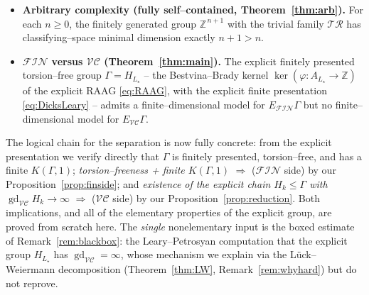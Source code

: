 \documentclass{amsart}
\theoremstyle{definition}
\newcommand{\Z}{\mathbb{Z}}
\newcommand{\FIN}{\mathcal{F\!I\!N}}
\newcommand{\VC}{\mathcal{V\!C}}
\newcommand{\gd}{\operatorname{gd}}
\begin{document}
\begin{itemize}
\item \textbf{Arbitrary complexity (fully self--contained, Theorem~\ref{thm:arb}).} For each
$n\ge 0$, the finitely generated group $\Z^{\,n+1}$ with the trivial family $\mathcal{TR}$ has
classifying--space minimal dimension exactly $n+1>n$.

\item \textbf{$\FIN$ versus $\VC$ (Theorem~\ref{thm:main}).} The explicit finitely presented
torsion--free group $\Gamma=H_{L_\star}$ -- the Bestvina--Brady kernel
$\ker(\varphi:A_{L_\star}\to\Z)$ of the explicit RAAG \eqref{eq:RAAG}, with the explicit finite
presentation \eqref{eq:DicksLeary} -- admits a finite--dimensional model for $E_{\FIN}\Gamma$
but no finite--dimensional model for $E_{\VC}\Gamma$.
\end{itemize}

The logical chain for the separation is now fully concrete: from the explicit presentation we
verify directly that $\Gamma$ is finitely presented, torsion--free, and has a finite
$K(\Gamma,1)$; \emph{torsion--freeness + finite $K(\Gamma,1)$} $\Rightarrow$ ($\FIN$ side) by
our Proposition~\ref{prop:finside}; and \emph{existence of the explicit chain $H_k\le\Gamma$
with $\gd_{\VC}H_k\to\infty$} $\Rightarrow$ ($\VC$ side) by our
Proposition~\ref{prop:reduction}. Both implications, and all of the elementary properties of
the explicit group, are proved from scratch here. The \emph{single} nonelementary input is the
boxed estimate of Remark~\ref{rem:blackbox}: the Leary--Petrosyan computation that the explicit
group $H_{L_\star}$ has $\gd_{\VC}=\infty$, whose mechanism we explain via the Lück--Weiermann
decomposition (Theorem~\ref{thm:LW}, Remark~\ref{rem:whyhard}) but do not reprove.
\end{document}
